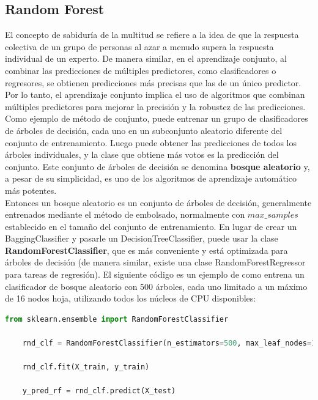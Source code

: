 \subsection{Random Forest}

El concepto de sabiduría de la multitud se refiere a la idea de que la respuesta colectiva 
de un grupo de personas al azar a menudo supera la respuesta individual de un experto. 
De manera similar, en el aprendizaje conjunto, al combinar las predicciones de múltiples 
predictores, como clasificadores o regresores, se obtienen predicciones más precisas que 
las de un único predictor. Por lo tanto, el aprendizaje conjunto implica el uso de algoritmos 
que combinan múltiples predictores para mejorar la precisión y la robustez de las predicciones.\\ 

Como ejemplo de método de conjunto, puede entrenar un grupo de clasificadores de árboles de 
decisión, cada uno en un subconjunto aleatorio diferente del conjunto de entrenamiento. 
Luego puede obtener las predicciones de todos los árboles individuales, y la clase que obtiene 
más votos es la predicción del conjunto. Este conjunto de árboles de decisión se denomina 
\textbf{bosque aleatorio} y, a pesar de su simplicidad, es uno de los algoritmos de 
aprendizaje automático más potentes. \cite{géron2022hands}\\ 

Entonces un bosque aleatorio es un conjunto de árboles de decisión, generalmente entrenados 
mediante el método de embolsado, normalmente con $max\_samples$ establecido en el tamaño del 
conjunto de entrenamiento. En lugar de crear un BaggingClassifier y pasarle un 
DecisionTreeClassifier, puede usar la clase \textbf{RandomForestClassifier}, que es más 
conveniente y está optimizada para árboles de decisión (de manera similar, existe una clase 
RandomForestRegressor para tareas de regresión). El siguiente código es un ejemplo de como  
entrena un clasificador de bosque aleatorio con 500 árboles, cada uno limitado a un máximo de 
16 nodos hoja, utilizando todos los núcleos de CPU disponibles:\cite{géron2022hands}\\ 

\begin{lstlisting}[style=mystylepython, language=Python, caption=bosque aleatorio con 500 árboles]
    from sklearn.ensemble import RandomForestClassifier

    rnd_clf = RandomForestClassifier(n_estimators=500, max_leaf_nodes=16, n_jobs=-1, random_state=42)

    rnd_clf.fit(X_train, y_train)

    y_pred_rf = rnd_clf.predict(X_test)    
\end{lstlisting}
